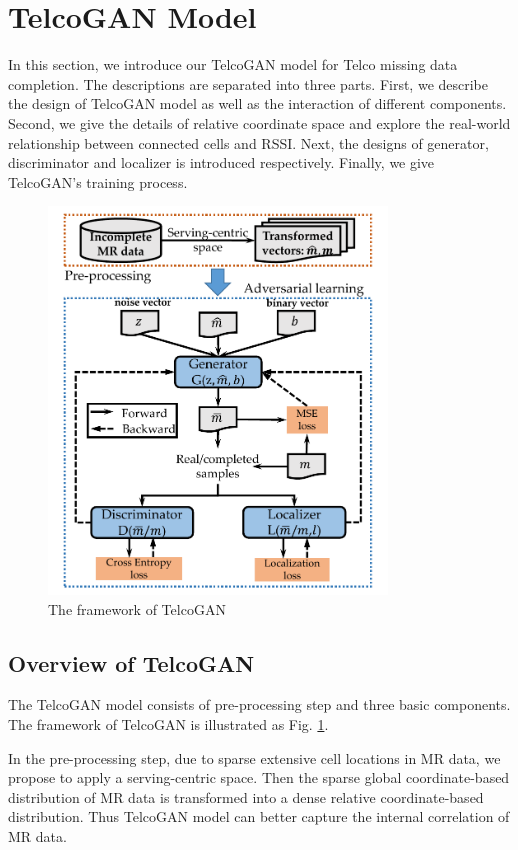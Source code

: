 \section{TelcoGAN Model}
In this section, we introduce our TelcoGAN model for Telco missing data completion. The descriptions are separated into three parts. First, we describe the design of TelcoGAN model as well as the interaction of different components. Second, we give the details of relative coordinate space and explore the real-world relationship between connected cells and RSSI. Next, the designs of generator, discriminator and localizer is introduced respectively. Finally, we give TelcoGAN's training process.

\begin{figure}
  \centering
  \includegraphics[width=9cm]{pics/framework.pdf}
  \caption{The framework of TelcoGAN}\label{fig:framework}
\end{figure}


\subsection{Overview of TelcoGAN}
The TelcoGAN model consists of pre-processing step and three basic components. The framework of TelcoGAN is illustrated as Fig. \ref{fig:framework}.

In the pre-processing step, due to sparse extensive cell locations in MR data, we propose to apply a serving-centric space. Then the sparse global coordinate-based distribution of MR data is transformed into a dense relative coordinate-based distribution. Thus TelcoGAN model can better capture the internal correlation of MR data.

